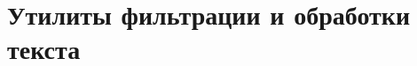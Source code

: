 \subsection{}



\subsection{}

\subsection{}

\subsection{}

\subsection{}

\subsection{}

\subsection{}

\subsection{}

\subsection{}

\newpage

\section{Утилиты фильтрации и обработки текста}

\subsection{}

